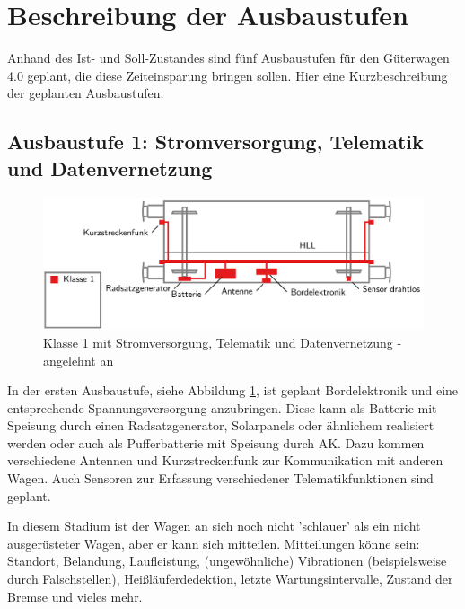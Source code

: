 \section{Beschreibung der Ausbaustufen}
Anhand des Ist- und Soll-Zustandes sind fünf Ausbaustufen für den Güterwagen 4.0 geplant, die diese Zeiteinsparung bringen sollen. Hier eine Kurzbeschreibung der geplanten Ausbaustufen.\par
\subsection{Ausbaustufe 1: Stromversorgung, Telematik und Datenvernetzung}
\begin{figure}[hbp] 
    \includegraphics[width=\textwidth]{Bilder/Ausbaustufen_1.PNG}
    \caption{Klasse 1 mit Stromversorgung, Telematik und Datenvernetzung - angelehnt an \cite{ETR_3} }
    \label{fig:Klasse1}
\end{figure} 
In der ersten Ausbaustufe, siehe Abbildung \ref{fig:Klasse1}, ist geplant Bordelektronik und eine entsprechende Spannungsversorgung anzubringen. Diese kann als Batterie mit Speisung durch einen Radsatzgenerator, Solarpanels oder ähnlichem realisiert werden oder auch als Pufferbatterie mit Speisung durch AK. Dazu kommen verschiedene Antennen und Kurzstreckenfunk zur Kommunikation mit anderen Wagen. Auch Sensoren zur Erfassung verschiedener Telematikfunktionen sind geplant.\par
In diesem Stadium ist der Wagen an sich noch nicht 'schlauer' als ein nicht ausgerüsteter Wagen, aber er kann sich mitteilen. Mitteilungen könne sein: Standort, Belandung, Laufleistung, (ungewöhnliche) Vibrationen (beispielsweise durch Falschstellen), Heißläuferdedektion, letzte Wartungsintervalle, Zustand der Bremse und vieles mehr.\par

